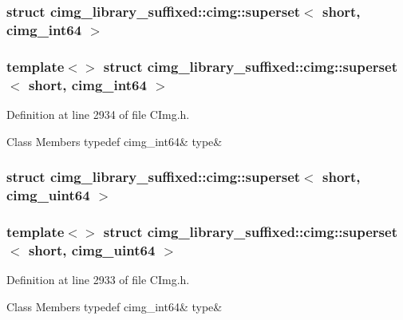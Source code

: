 \subsubsection{struct cimg\+\_\+library\+\_\+suffixed\+:\+:cimg\+:\+:superset$<$ short, cimg\+\_\+int64 $>$}
\subsubsection*{template$<$$>$\newline
struct cimg\+\_\+library\+\_\+suffixed\+::cimg\+::superset$<$ short, cimg\+\_\+int64 $>$}



Definition at line 2934 of file C\+Img.\+h.

\begin{DoxyFields}{Class Members}
\mbox{\label{namespacecimg__library__suffixed_1_1cimg_a824a9cd4ce9116587d3106338e6ae618}} 
typedef cimg\_int64&
type&
\\
\hline

\end{DoxyFields}
\label{structcimg__library__suffixed_1_1cimg_1_1superset_3_01short_00_01cimg__uint64_01_4}
\subsubsection{struct cimg\+\_\+library\+\_\+suffixed\+:\+:cimg\+:\+:superset$<$ short, cimg\+\_\+uint64 $>$}
\subsubsection*{template$<$$>$\newline
struct cimg\+\_\+library\+\_\+suffixed\+::cimg\+::superset$<$ short, cimg\+\_\+uint64 $>$}



Definition at line 2933 of file C\+Img.\+h.

\begin{DoxyFields}{Class Members}
\mbox{\label{namespacecimg__library__suffixed_1_1cimg_a39f178f8a05fad58fd7980f234fa0357}} 
typedef cimg\_int64&
type&
\\
\hline

\end{DoxyFields}
\label{structcimg__library__suffixed_1_1cimg_1_1superset_3_01short_00_01double_01_4}
